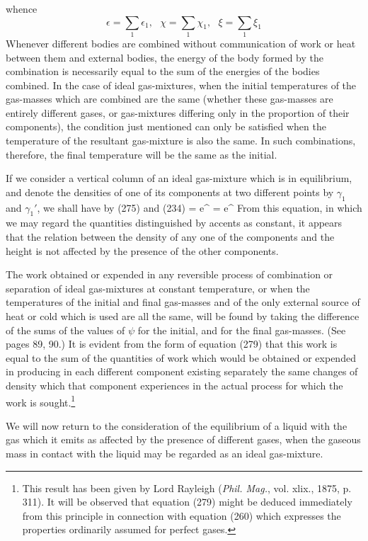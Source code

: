 \documentclass[12pt]{article}
\begin{document}
whence        $$\epsilon = \sum_1 \epsilon_1, \ \ \ \chi = \sum_1 \chi_1,\ \ \ \xi = \sum_1 \xi_1$$
Whenever different bodies are combined without communication of work or heat between them and external bodies, the energy of the body formed by the combination is necessarily equal to the sum of the energies of the bodies combined. In the case of ideal gas-mixtures, when the initial temperatures of the gas-masses which are combined are the same (whether these gas-masses are entirely different gases, or gas-mixtures differing only in the proportion of their components), the condition just mentioned can only be satisfied when the temperature of the resultant gas-mixture is also the same.  In such combinations, therefore, the final temperature will be the same as the initial.


If we consider a vertical column of an ideal gas-mixture which is
in equilibrium, and denote the densities of one of its components at two different points by $\gamma_1$ and $\gamma_1'$, we shall have by (275) and (234)
\eqs {} = e^{} = e^{}    \label{284}\eqe
From this equation, in which we may regard the quantities distinguished by accents as constant, it appears that the relation between the density of any one of the components and the height is not affected by the presence of the other components.


The work obtained or expended in any reversible process of combination or separation of ideal gas-mixtures at constant temperature, or when the temperatures of the initial and final gas-masses and of the only external source of heat or cold which is used are all the same, will be found by taking the difference of the sums of the values of $\psi$ for the initial, and for the final gas-masses. (See pages 89, 90.) It is evident from the form of equation (279) that this work is equal to the sum of the quantities of work which would be obtained or expended in producing in each different component existing separately the same changes of density which that component experiences in the actual process for which the work is sought.\footnote{This result has been given by Lord Rayleigh (\textit{Phil. Mag.}, vol. xlix., 1875, p. 311). It will be observed that equation (279) might be deduced immediately from this principle in connection with equation (260) which expresses the properties ordinarily assumed for perfect gases.}


We will now return to the consideration of the equilibrium of a liquid with the gas which it emits as affected by the presence of different gases, when the gaseous mass in contact with the liquid may be regarded as an ideal gas-mixture.
\end{document}

